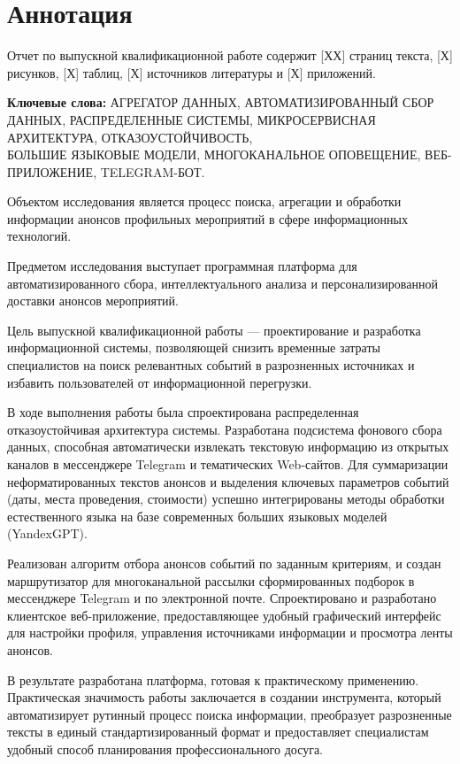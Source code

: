 \chapter*{Аннотация}

Отчет по выпускной квалификационной работе содержит [ХХ] страниц текста, [Х] рисунков, [Х] таблиц, [Х] источников литературы и [Х] приложений.

\textbf{Ключевые слова:} АГРЕГАТОР ДАННЫХ, АВТОМАТИЗИРОВАННЫЙ СБОР ДАННЫХ, РАСПРЕДЕЛЕННЫЕ СИСТЕМЫ, МИКРОСЕРВИСНАЯ АРХИТЕКТУРА, ОТКАЗОУСТОЙЧИВОСТЬ,\\БОЛЬШИЕ ЯЗЫКОВЫЕ МОДЕЛИ, МНОГОКАНАЛЬНОЕ ОПОВЕЩЕНИЕ, ВЕБ-ПРИЛОЖЕНИЕ, TELEGRAM-БОТ.

Объектом исследования является процесс поиска, агрегации и обработки информации анонсов профильных мероприятий в сфере информационных технологий.

Предметом исследования выступает программная платформа для автоматизированного сбора, интеллектуального анализа и персонализированной доставки анонсов мероприятий.

Цель выпускной квалификационной работы — проектирование и разработка информационной системы, позволяющей снизить временные затраты специалистов на поиск релевантных событий в разрозненных источниках и избавить пользователей от информационной перегрузки.

В ходе выполнения работы была спроектирована распределенная отказоустойчивая архитектура системы. 
Разработана подсистема фонового сбора данных, способная автоматически извлекать текстовую информацию из открытых каналов в мессенджере Telegram и тематических Web-сайтов. 
Для суммаризации неформатированных текстов анонсов и выделения ключевых параметров событий (даты, места проведения, стоимости) успешно интегрированы методы обработки естественного языка на базе современных больших языковых моделей (YandexGPT).

Реализован алгоритм отбора анонсов событий по заданным критериям, и создан маршрутизатор для многоканальной рассылки сформированных подборок в мессенджере Telegram и по электронной почте. 
Спроектировано и разработано клиентское веб-приложение, предоставляющее удобный графический интерфейс для настройки профиля, управления источниками информации и просмотра ленты анонсов.

В результате разработана платформа, готовая к практическому применению. 
Практическая значимость работы заключается в создании инструмента, который автоматизирует рутинный процесс поиска информации, преобразует разрозненные тексты в единый стандартизированный формат и предоставляет специалистам удобный способ планирования профессионального досуга.

